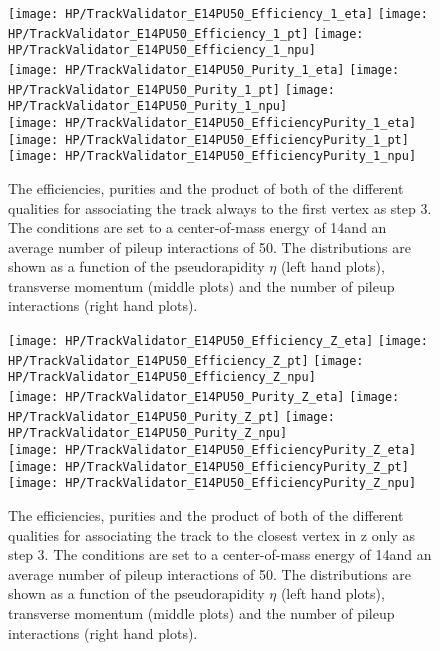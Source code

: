 \begin{figure}[!h]
  \centering
  \texttt{[image: HP/TrackValidator\_E14PU50\_Efficiency\_1\_eta]}
  \texttt{[image: HP/TrackValidator\_E14PU50\_Efficiency\_1\_pt]}
  \texttt{[image: HP/TrackValidator\_E14PU50\_Efficiency\_1\_npu]}
   \\
  \texttt{[image: HP/TrackValidator\_E14PU50\_Purity\_1\_eta]}
  \texttt{[image: HP/TrackValidator\_E14PU50\_Purity\_1\_pt]}
  \texttt{[image: HP/TrackValidator\_E14PU50\_Purity\_1\_npu]}
   \\
  \texttt{[image: HP/TrackValidator\_E14PU50\_EfficiencyPurity\_1\_eta]}
  \texttt{[image: HP/TrackValidator\_E14PU50\_EfficiencyPurity\_1\_pt]}
  \texttt{[image: HP/TrackValidator\_E14PU50\_EfficiencyPurity\_1\_npu]}
  \caption[Efficiencies, purities and their product of the different qualities of the association map with associating to the first vertex always as step 3 with 14\TeV and PU=50]{The efficiencies, purities and the product of both of the different qualities for associating the track always to the first vertex as step 3. The conditions are set to a center-of-mass energy of 14\TeV and an average number of pileup interactions of 50. The distributions are shown as a function of the pseudorapidity $\eta$ (left hand plots), transverse momentum (middle plots) and the number of pileup interactions (right hand plots).}
\end{figure}
\clearpage

\begin{figure}[!h]
  \centering
  \texttt{[image: HP/TrackValidator\_E14PU50\_Efficiency\_Z\_eta]}
  \texttt{[image: HP/TrackValidator\_E14PU50\_Efficiency\_Z\_pt]}
  \texttt{[image: HP/TrackValidator\_E14PU50\_Efficiency\_Z\_npu]}
   \\
  \texttt{[image: HP/TrackValidator\_E14PU50\_Purity\_Z\_eta]}
  \texttt{[image: HP/TrackValidator\_E14PU50\_Purity\_Z\_pt]}
  \texttt{[image: HP/TrackValidator\_E14PU50\_Purity\_Z\_npu]}
   \\
  \texttt{[image: HP/TrackValidator\_E14PU50\_EfficiencyPurity\_Z\_eta]}
  \texttt{[image: HP/TrackValidator\_E14PU50\_EfficiencyPurity\_Z\_pt]}
  \texttt{[image: HP/TrackValidator\_E14PU50\_EfficiencyPurity\_Z\_npu]}
  \caption[Efficiencies, purities and their product of the different qualities of the association map with associating to the closest vertex in z only as step 3 with 14\TeV and PU=50]{The efficiencies, purities and the product of both of the different qualities for associating the track to the closest vertex in z only as step 3. The conditions are set to a center-of-mass energy of 14\TeV and an average number of pileup interactions of 50. The distributions are shown as a function of the pseudorapidity $\eta$ (left hand plots), transverse momentum (middle plots) and the number of pileup interactions (right hand plots).}
\end{figure}
\clearpage

